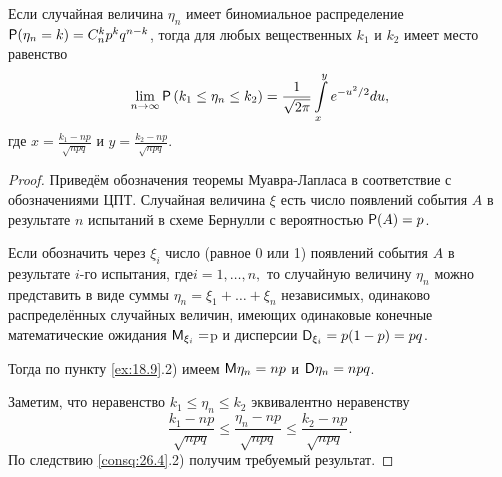 \begin{theorem}
\label{th:26.6}
Если случайная величина $\eta_n$ имеет биномиальное распределение $\P(\eta_n = k) = C_n^k p^k q^{n-k}$, тогда для любых вещественных $k_1$ и $k_2$ имеет место равенство
$$
\lim\limits_{n\to\infty} \P\left(k_1\leq\eta_n\leq k_2\right)=
\frac{1}{\sqrt{2\pi}}\int\limits_{x}^{y} e^{-u^2/2} du,
$$
где $x=\frac{k_1-np}{\sqrt{npq}}$ и $y=\frac{k_2-np}{\sqrt{npq}}$.
\end{theorem}
\begin{proof}
Приведём обозначения теоремы Муавра-Лапласа в соответствие с обозначениями ЦПТ. Случайная величина $\xi$ есть число появлений события $A$ в результате $n$ испытаний в схеме Бернулли с вероятностью
$\P(A) = p$. 

Если обозначить через $\xi_i$ число (равное 0 или 1) появлений события $A$ в результате $i$-го испытания, где$ i = 1, \ldots , n,$ то случайную величину $\eta_n$ можно представить в виде суммы $\eta_n = \xi_1 + \ldots + \xi_n$ независимых, одинаково распределённых случайных величин, имеющих одинаковые конечные математические ожидания $\M_{\xi_i} = $p и дисперсии $\D_{\xi_i} = p(1 - p) = pq$. 

Тогда по пункту \ref{ex:18.9}.2) имеем $\M\eta_n = np$ и $\D\eta_n = npq$. 

Заметим, что неравенство $k_1\leq\eta_n\leq k_2$
эквивалентно неравенству
$$
\frac{k_1-np}{\sqrt{npq}}\leq
\frac{\eta_n-np}{\sqrt{npq}}\leq
\frac{k_2-np}{\sqrt{npq}}.
$$
По следствию \ref{consq:26.4}.2) получим требуемый результат.
\end{proof}

